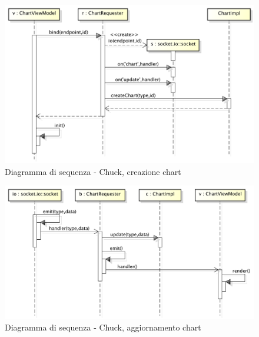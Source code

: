            \begin{figure}[H]
                \centering
                \includegraphics[scale=0.3]{DefinizioneDiProdotto/Pics/ChuckInserimentoChart}
                \caption{Diagramma di sequenza - Chuck, creazione chart}
            \end{figure}


            \begin{figure}[H]
                \centering
                \includegraphics[scale=0.3]{DefinizioneDiProdotto/Pics/ChuckAggiornamentoChart}
                \caption{Diagramma di sequenza - Chuck, aggiornamento chart}
            \end{figure}